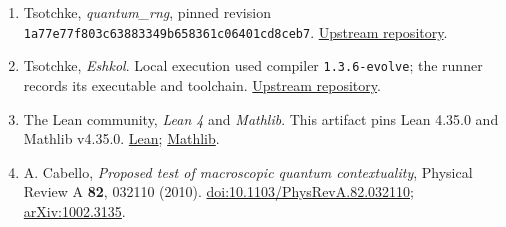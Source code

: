 \documentclass[10pt,a4paper]{article}
\begin{document}
{\begin{enumerate}
\item
  Tsotchke, \emph{quantum\_rng}, pinned revision \texttt{1a77e77f803c63883349b658361c06401cd8ceb7}. \href{https://github.com/tsotchke/quantum_rng}{Upstream repository}.
\item
  Tsotchke, \emph{Eshkol}. Local execution used compiler \texttt{1.3.6-evolve}; the runner records its executable and toolchain. \href{https://github.com/tsotchke/eshkol}{Upstream repository}.
\item
  The Lean community, \emph{Lean 4} and \emph{Mathlib}. This artifact pins Lean 4.35.0 and Mathlib v4.35.0. \href{https://github.com/leanprover/lean4}{Lean}; \href{https://github.com/leanprover-community/mathlib4}{Mathlib}.
\item
  A. Cabello, \emph{Proposed test of macroscopic quantum contextuality}, Physical Review A \textbf{82}, 032110 (2010). \href{https://doi.org/10.1103/PhysRevA.82.032110}{doi:10.1103/PhysRevA.82.032110}; \href{https://arxiv.org/abs/1002.3135}{arXiv:1002.3135}.
\end{enumerate}
}
\end{document}
